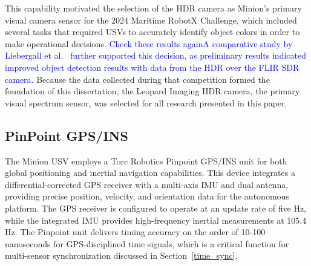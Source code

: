 \documentclass{erauthesis}
\begin{document}
This capability motivated the selection of the \ac{HDR} camera as Minion's primary visual camera sensor for the 2024 Maritime RobotX Challenge, which included several tasks that required \acp{USV} to accurately identify object colors in order to make operational decisions.
\textcolor{blue}{Check these results again}\textcolor{blue}{A comparative study by Liebergall et al.~\cite{liebergall} further supported this decision, as preliminary results indicated improved object detection results with data from the \ac{HDR} over the FLIR \ac{SDR} camera.}
Because the data collected during that competition formed the foundation of this dissertation, the Leopard Imaging \ac{HDR} camera, the primary visual spectrum sensor, was selected for all research presented in this paper.






\subsection{PinPoint GPS/INS} \label{sensors_GPS}


The Minion \ac{USV} employs a Torc Robotics Pinpoint \ac{GPS}/\ac{INS} unit for both global positioning and inertial navigation capabilities.
This device integrates a differential-corrected \ac{GPS} receiver with a multi-axis \ac{IMU} and dual antenna, providing precise position, velocity, and orientation data for the autonomous platform.
The \ac{GPS} receiver is configured to operate at an update rate of five Hz, while the integrated \ac{IMU} provides high-frequency inertial measurements at 105.4 Hz.
The Pinpoint unit delivers timing accuracy on the order of 10-100 nanoseconds for \ac{GPS}-disciplined time signals, which is a critical function for multi-sensor synchronization discussed in Section~\ref{time_sync}.
\end{document}
